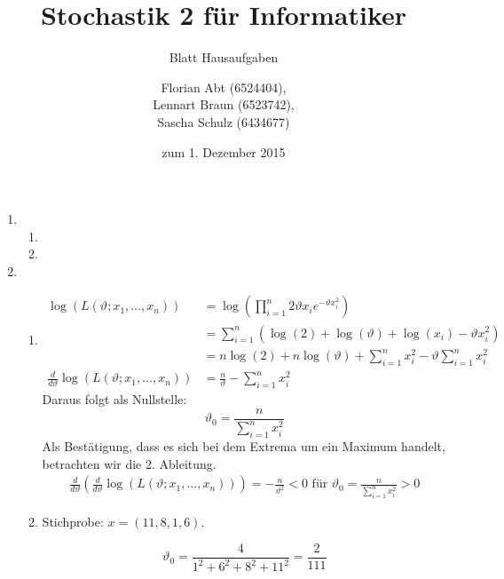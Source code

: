 \documentclass[a4paper]{scrartcl}
\title{Stochastik 2 für Informatiker}
\subtitle{Blatt {\blattnr} Hausaufgaben}
\author{
    Florian Abt (6524404), \\
    Lennart Braun (6523742), \\
    Sascha Schulz (6434677)
}
\date{zum 1. Dezember 2015}
\def \blattnr {7}
\begin{document}
\maketitle

\begin{enumerate}[label=\bfseries \blattnr.\arabic*]


\item 
\begin{enumerate}
\item 
\item 
\end{enumerate}

\item 
\begin{enumerate}
\item 

\begin{equation*}
 \begin{split}
   \log \left( L(\vartheta;x_1,\ldots,x_n) \right)
   &= \log \left( \prod_{i=1}^n 2\vartheta x_i e^{-\vartheta x_i^2} \right) \\
   &= \sum_{i=1}^n \left( \log(2) + \log(\vartheta) + \log(x_i) -\vartheta x_i^2 \right) \\
   &= n\log(2) + n\log(\vartheta) + \sum_{i=1}^n x_i^2 - \vartheta \sum_{i=1}^n x_i^2 \\   
   \frac{d}{d\vartheta} \log \left( L(\vartheta;x_1,\ldots,x_n) \right)
   &= \frac{n}\vartheta - \sum_{i=1}^n x_i^2
  \end{split}
\end{equation*}
Daraus folgt als Nullstelle:
\begin{equation*}
\vartheta_0 = \frac{n}{\sum_{i=1}^n x_i^2} 
\end{equation*}
Als Bestätigung, dass es sich bei dem Extrema um ein Maximum handelt, betrachten wir die 2. Ableitung.
\begin{equation*}
 \begin{split} 
   \frac{d}{d\vartheta} \left( \frac{d}{d\vartheta} \log \left( L(\vartheta;x_1,\ldots,x_n) \right) \right)
   = -\frac{n}{\vartheta^2}
   < 0 \text{ für } \vartheta_0 = \frac{n}{\sum_{i=1}^n x_i^2} > 0
  \end{split}
\end{equation*}

\item 
Stichprobe: $x = (11,8,1,6)$.

\begin{equation*}
\vartheta_0 = \frac{4}{1^2 + 6^2 + 8^2 + 11^2} = \frac2{111} 
\end{equation*}


\end{enumerate}
\end{enumerate}
\end{document}
